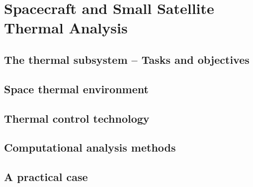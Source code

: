 %
%
%


\chapter{Spacecraft and Small Satellite Thermal Analysis}
\label{chp:Thermal}

    
\section{The thermal subsystem – Tasks and objectives}
\label{sec:Thermal_Subsystem}

 {\small\textit{\lipsum[1-2]}}




\section{Space thermal environment}
\label{sec:Thermal_Environment}

 {\small\textit{\lipsum[1-2]}}



\section{Thermal control technology}
\label{sec:Thermal_Technology}

 {\small\textit{\lipsum[1-2]}}




\section{Computational analysis methods}
\label{sec:Thermal_Methods}

 {\small\textit{\lipsum[1-2]}}



\section{A practical case}
\label{sec:Thermal_Pratical}

